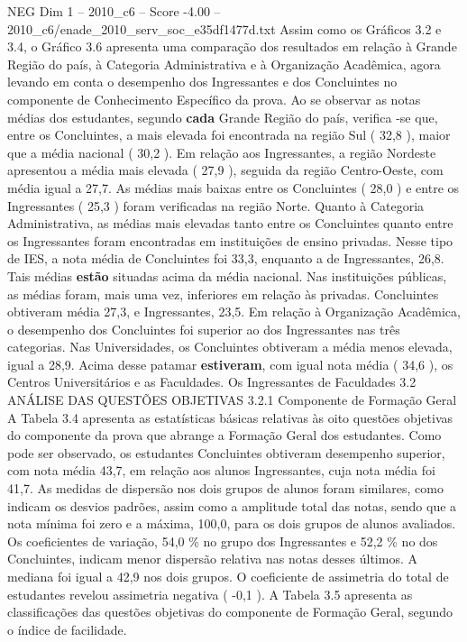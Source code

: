 \begin{textsample}{NEG Dim 1 – 2010\_c6 – Score -4.00 – 2010\_c6/enade\_2010\_serv\_soc\_e35df1477d.txt}
Assim como os Gráficos 3.2 e 3.4, o Gráfico 3.6 apresenta uma comparação dos resultados em relação à Grande Região do país, à Categoria Administrativa e à Organização Acadêmica, agora levando em conta o desempenho dos Ingressantes e dos Concluintes no componente de Conhecimento Específico da prova.
Ao se observar as notas médias dos estudantes, segundo \textbf{cada} Grande Região do país, verifica -se que, entre os Concluintes, a mais elevada foi encontrada na região Sul ( 32,8 ), maior que a média nacional ( 30,2 ).
Em relação aos Ingressantes, a região Nordeste apresentou a média mais elevada ( 27,9 ), seguida da região Centro-Oeste, com média igual a 27,7.
As médias mais baixas entre os Concluintes ( 28,0 ) e entre os Ingressantes ( 25,3 ) foram verificadas na região Norte.
Quanto à Categoria Administrativa, as médias mais elevadas tanto entre os Concluintes quanto entre os Ingressantes foram encontradas em instituições de ensino privadas.
Nesse tipo de IES, a nota média de Concluintes foi 33,3, enquanto a de Ingressantes, 26,8.
Tais médias \textbf{estão} situadas acima da média nacional.
Nas instituições públicas, as médias foram, mais uma vez, inferiores em relação às privadas.
Concluintes obtiveram média 27,3, e Ingressantes, 23,5.
Em relação à Organização Acadêmica, o desempenho dos Concluintes foi superior ao dos Ingressantes nas três categorias.
Nas Universidades, os Concluintes obtiveram a média menos elevada, igual a 28,9.
Acima desse patamar \textbf{estiveram}, com igual nota média ( 34,6 ), os Centros Universitários e as Faculdades.
Os Ingressantes de Faculdades 3.2 ANÁLISE DAS QUESTÕES OBJETIVAS 3.2.1 Componente de Formação Geral A Tabela 3.4 apresenta as estatísticas básicas relativas às oito questões objetivas do componente da prova que abrange a Formação Geral dos estudantes.
Como pode ser observado, os estudantes Concluintes obtiveram desempenho superior, com nota média 43,7, em relação aos alunos Ingressantes, cuja nota média foi 41,7.
As medidas de dispersão nos dois grupos de alunos foram similares, como indicam os desvios padrões, assim como a amplitude total das notas, sendo que a nota mínima foi zero e a máxima, 100,0, para os dois grupos de alunos avaliados.
Os coeficientes de variação, 54,0 \% no grupo dos Ingressantes e 52,2 \% no dos Concluintes, indicam menor dispersão relativa nas notas desses últimos.
A mediana foi igual a 42,9 nos dois grupos.
O coeficiente de assimetria do total de estudantes revelou assimetria negativa ( -0,1 ).
A Tabela 3.5 apresenta as classificações das questões objetivas do componente de Formação Geral, segundo o índice de facilidade.

\end{textsample}
